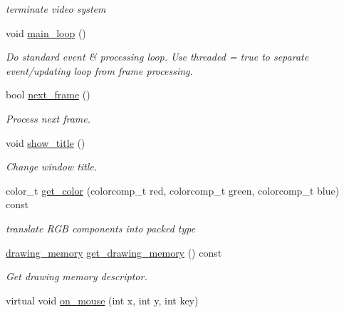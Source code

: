 \begin{DoxyCompactItemize}
\begin{DoxyCompactList}\small\item\em terminate video system \end{DoxyCompactList}\item 
void \hyperlink{classvideo_a664f8ebc86f954bb4435c34b62116611}{main\+\_\+loop} ()
\begin{DoxyCompactList}\small\item\em Do standard event \& processing loop. Use threaded = true to separate event/updating loop from frame processing. \end{DoxyCompactList}\item 
bool \hyperlink{classvideo_a267748c31dee7dd46d47b575373959db}{next\+\_\+frame} ()
\begin{DoxyCompactList}\small\item\em Process next frame. \end{DoxyCompactList}\item 
\hypertarget{classvideo_ad46516b8ba69923d9cd0eb5102addfca}{}void \hyperlink{classvideo_ad46516b8ba69923d9cd0eb5102addfca}{show\+\_\+title} ()\label{classvideo_ad46516b8ba69923d9cd0eb5102addfca}

\begin{DoxyCompactList}\small\item\em Change window title. \end{DoxyCompactList}\item 
\hypertarget{classvideo_aa43e315469b17c1fd04bdb5beaa7609d}{}color\+\_\+t \hyperlink{classvideo_aa43e315469b17c1fd04bdb5beaa7609d}{get\+\_\+color} (colorcomp\+\_\+t red, colorcomp\+\_\+t green, colorcomp\+\_\+t blue) const \label{classvideo_aa43e315469b17c1fd04bdb5beaa7609d}

\begin{DoxyCompactList}\small\item\em translate R\+G\+B components into packed type \end{DoxyCompactList}\item 
\hypertarget{classvideo_a81f8912fb1ff13511b4af1d33a49b0f8}{}\hyperlink{classdrawing__memory}{drawing\+\_\+memory} \hyperlink{classvideo_a81f8912fb1ff13511b4af1d33a49b0f8}{get\+\_\+drawing\+\_\+memory} () const \label{classvideo_a81f8912fb1ff13511b4af1d33a49b0f8}

\begin{DoxyCompactList}\small\item\em Get drawing memory descriptor. \end{DoxyCompactList}\item 
\hypertarget{classvideo_a5955113b587789774093c04610501353}{}virtual void \hyperlink{classvideo_a5955113b587789774093c04610501353}{on\+\_\+mouse} (int x, int y, int key)\label{classvideo_a5955113b587789774093c04610501353}


\end{DoxyCompactItemize}
